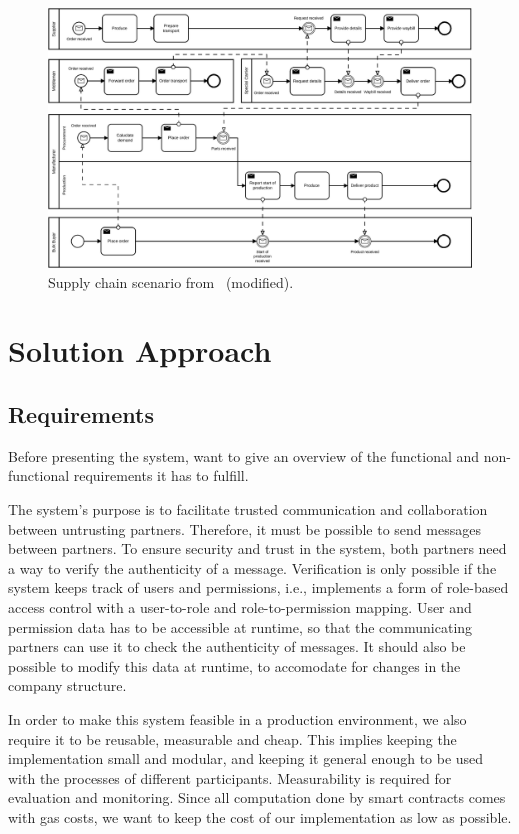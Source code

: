 \documentclass[runningheads]{llncs}
\begin{document}
\begin{figure}
	\centering
	\includegraphics[width=\textwidth]{fig/collaboration.eps}
	\caption{Supply chain scenario from~\cite{weber2016untrusted} (modified).}
	\label{fig:collaboration}
\end{figure}

\section{Solution Approach} \label{solutionapproach}

\subsection{Requirements}

Before presenting the system, want to give an overview of the functional and non-functional requirements it has to fulfill.

The system's purpose is to facilitate trusted communication and collaboration between untrusting partners.
Therefore, it must be possible to send messages between partners.
To ensure security and trust in the system, both partners need a way to verify the authenticity of a message.
Verification is only possible if the system keeps track of users and permissions, i.e., implements a form of role-based access control with a user-to-role and role-to-permission mapping.
User and permission data has to be accessible at runtime, so that the communicating partners can use it to check the authenticity of messages.
It should also be possible to modify this data at runtime, to accomodate for changes in the company structure.

In order to make this system feasible in a production environment, we also require it to be reusable, measurable and cheap.
This implies keeping the implementation small and modular, and keeping it general enough to be used with the processes of different participants.
Measurability is required for evaluation and monitoring.
Since all computation done by smart contracts comes with gas costs, we want to keep the cost of our implementation as low as possible.
\end{document}
